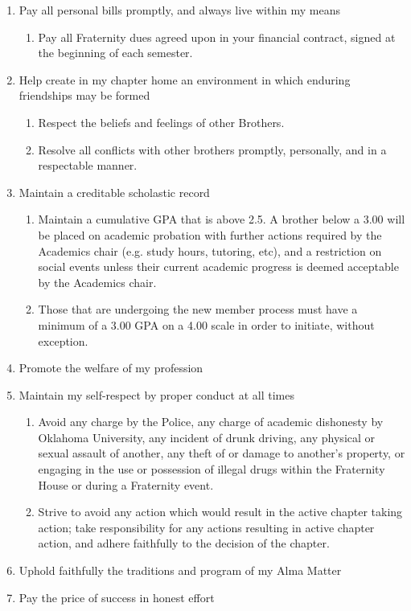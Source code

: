 \documentclass{article}
\begin{document}
\begin{enumerate}
    \item Pay all personal bills promptly, and always live within my means
    \begin{enumerate}
        \item Pay all Fraternity dues agreed upon in your financial contract, signed at the beginning of each semester.
    \end{enumerate}
    \item Help create in my chapter home an environment in which enduring friendships may be formed
    \begin{enumerate}
        \item Respect the beliefs and feelings of other Brothers.
        \item Resolve all conflicts with other brothers promptly, personally, and in a respectable manner.
    \end{enumerate}
    \item Maintain a creditable scholastic record
    \begin{enumerate}
        \item Maintain a cumulative GPA that is above 2.5. A brother below a 3.00 will be placed on academic probation with further actions required by the Academics chair (e.g. study hours, tutoring, etc), and a restriction on social events unless their current academic progress is deemed acceptable by the Academics chair.
        \item Those that are undergoing the new member process must have a minimum of a 3.00 GPA on a 4.00 scale in order to initiate, without exception.
    \end{enumerate}
    \item Promote the welfare of my profession
    \item Maintain my self-respect by proper conduct at all times
    \begin{enumerate}
        \item Avoid any charge by the Police, any charge of academic dishonesty by Oklahoma University, any incident of drunk driving, any physical or sexual assault of another, any theft of or damage to another’s property, or engaging in the use or possession of illegal drugs within the Fraternity House or during a Fraternity event.
        \item Strive to avoid any action which would result in the active chapter taking action; take responsibility for any actions resulting in active chapter action, and adhere faithfully to the decision of the chapter.
    \end{enumerate}
    \item Uphold faithfully the traditions and program of my Alma Matter
    \item Pay the price of success in honest effort
    \begin{enumerate}
    \end{enumerate}
\end{enumerate}
\end{document}
